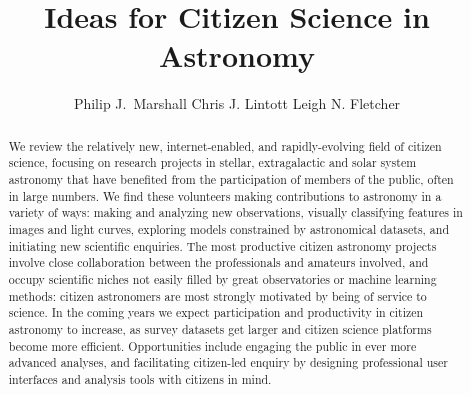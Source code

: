 \documentclass{ar2e}
\begin{document}

\jvol{}
\ARinfo{}

\title{Ideas for Citizen Science in Astronomy}

\author{%
Philip J.\ Marshall
Chris J. Lintott
Leigh N. Fletcher
}




\begin{abstract} 

We review the relatively new, internet-enabled, and rapidly-evolving field of
citizen science, focusing on research projects in stellar, extragalactic and 
solar system astronomy that have benefited from the participation of members of
the public, often in large numbers. We find these volunteers making
contributions to astronomy in a variety of ways: making and analyzing new
observations, visually classifying features in images and light curves,
exploring models constrained by astronomical datasets, and initiating new
scientific enquiries.  The most productive citizen astronomy projects involve
close collaboration between the professionals and amateurs involved, and occupy
scientific niches not easily filled by great observatories or machine learning
methods: citizen astronomers are most strongly motivated by being of service to
science. In the coming years we expect participation and productivity in citizen
astronomy to increase, as survey datasets get larger and citizen science
platforms become more efficient. Opportunities include engaging the public in
ever more advanced analyses, and facilitating citizen-led enquiry by designing
professional user interfaces and analysis tools with citizens in mind.

\end{abstract}
\end{document}
